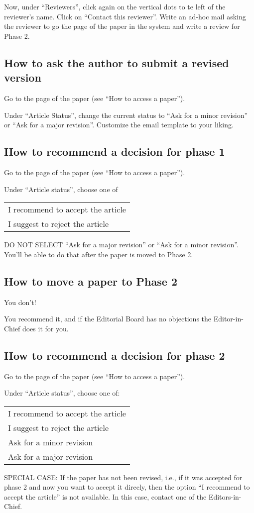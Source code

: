 \documentclass[runningheads]{llncs}
\begin{document}
Now, under ``Reviewers'', click again on the vertical dots to te left of the 
reviewer's name. Click on ``Contact this reviewer''. Write an ad-hoc mail 
asking the reviewer to go the page of the paper in the system and write
a review for Phase 2. 


\subsection*{How to ask the author to submit a revised version}
Go to the page of the paper (see ``How to access a paper'').

Under  ``Article Status'', change the current status to
``Ask for a minor revision'' or ``Ask for a major revision''. Customize the
email template to your liking.

\subsection*{How to recommend a decision for phase 1}
Go to the page of the paper (see ``How to access a paper'').

Under ``Article status'', choose one of
\begin{center}
\begin{tabular}{l}
I recommend to accept the article \\
I suggest to reject the article 
\end{tabular}
\end{center}
DO NOT SELECT ``Ask for a major revision'' or ``Ask for a minor revision''. You'll be able to do that
after the paper is moved to Phase 2.


\subsection*{How to move a paper to Phase 2}

You don't! 

You recommend it, and if the Editorial Board has no objections the Editor-in-Chief does it for you.


\subsection*{How to recommend a decision for phase 2}
Go to the page of the paper (see ``How to access a paper'').

Under ``Article status'', choose one of:
\begin{center}
\begin{tabular}{l}
I recommend to accept the article \\
I suggest to reject the article \\
Ask for a minor revision \\
Ask for a major revision
\end{tabular}
\end{center}

SPECIAL CASE: If the paper has not been revised, i.e., if it was accepted for phase 2 and now you want to accept it direcly,
then the option ``I recommend to accept the article'' is not available. In this case, contact one of the Editors-in-Chief.
\end{document}
